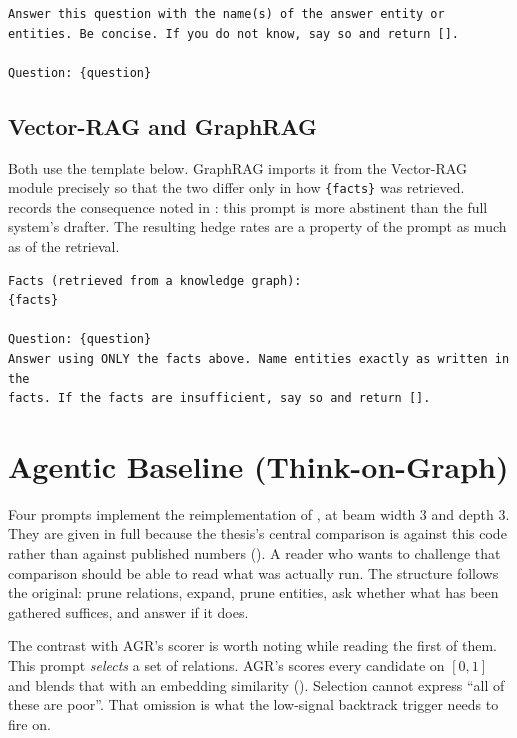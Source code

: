 \begin{lstlisting}[style=verbatimblock]
Answer this question with the name(s) of the answer entity or
entities. Be concise. If you do not know, say so and return [].

Question: {question}
\end{lstlisting}

\subsection*{Vector-RAG and GraphRAG}

Both use the template below. GraphRAG imports it from the Vector-RAG module
precisely so that the two differ only in how \verb|{facts}| was retrieved.
 records the consequence noted in
: this prompt is more abstinent than the full
system's drafter. The resulting hedge rates are a property of the prompt as
much as of the retrieval.

\begin{lstlisting}[style=verbatimblock]
Facts (retrieved from a knowledge graph):
{facts}

Question: {question}
Answer using ONLY the facts above. Name entities exactly as written in the
facts. If the facts are insufficient, say so and return [].
\end{lstlisting}

\section{Agentic Baseline (Think-on-Graph)}\label{app:prompt-tog}

Four prompts implement the reimplementation of , at beam
width $3$ and depth $3$. They are given in full because the thesis's central
comparison is against this code rather than against published numbers
(). A reader who wants to challenge that comparison
should be able to read what was actually run. The structure follows the
original: prune relations, expand, prune entities, ask whether what has been
gathered suffices, and answer if it does.

The contrast with AGR's scorer is worth noting while reading the first of them.
This prompt \emph{selects} a set of relations. AGR's scores every candidate on
$[0,1]$ and blends that with an embedding similarity ().
Selection cannot express ``all of these are poor''. That omission is what the
low-signal backtrack trigger needs to fire on.

